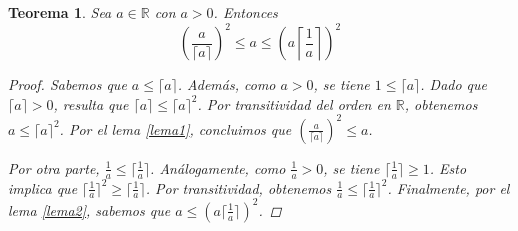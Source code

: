 \documentclass[10pt,a4paper]{article}
\theoremstyle{ts}
\newtheorem{teo}{Teorema}[section]
\newcommand{\rpar}[1]{\left( #1\right) }
\begin{document}
\begin{teo}\label{cotas}
Sea $a\in\mathbb{R}$ con $a>0$. Entonces
\[\rpar{\dfrac{a}{\lceil a\rceil}}^2\leq a\leq \rpar{a\left\lceil\dfrac{1}{a}\right\rceil}^2\]
\begin{proof}
Sabemos que $a\leq \lceil a\rceil$. Adem\'as, como $a>0$, se tiene $1\leq \lceil a\rceil$. Dado que $\lceil a\rceil>0$, resulta que $\lceil a\rceil\leq\lceil a\rceil^2$. Por transitividad del orden en $\mathbb{R}$, obtenemos $a\leq \lceil a\rceil^2$. Por el lema \ref{lema1}, concluimos que $(\frac{a}{\lceil a\rceil})^2\leq a$.

Por otra parte, $\frac{1}{a}\leq\lceil\frac{1}{a}\rceil$. An\'alogamente, como $\frac{1}{a}>0$, se tiene $\lceil \frac{1}{a}\rceil\geq 1$. Esto implica que $\lceil \frac{1}{a}\rceil^2\geq \lceil \frac{1}{a}\rceil$. Por transitividad, obtenemos $\frac{1}{a}\leq \lceil \frac{1}{a}\rceil^2$. Finalmente, por el lema \ref{lema2}, sabemos que $a\leq \rpar {a\lceil\frac{1}{a}\rceil}^2$.
\end{proof}
\end{teo}
\end{document}

